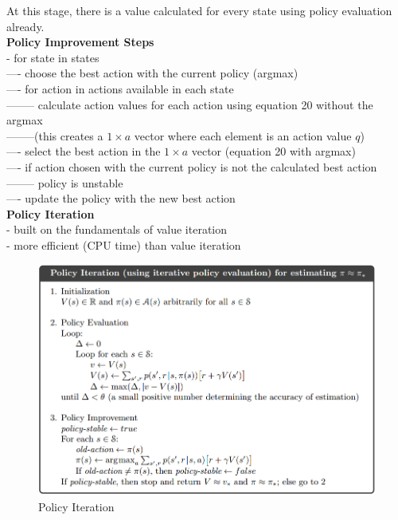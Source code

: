 \documentclass{article}
\begin{document}
\noindent
At this stage, there is a value calculated for every state using policy
evaluation already.\\

\noindent
\textbf{Policy Improvement Steps}\\
- for state in states \\
---- choose the best action with the current policy (argmax)\\
---- for action in actions available in each state \\
-------- calculate action values for each action using equation 20 without the
argmax\\
--------(this creates a $1 \times a$ vector where each element is an
action value $q$)\\
---- select the best action in the $ 1 \times a$ vector (equation 20 with
argmax)\\
---- if action chosen with the current policy is not the calculated best
action\\
-------- policy is unstable\\
---- update the policy with the new best action\\

\noindent
\textbf{Policy Iteration}\\
- built on the fundamentals of value iteration\\
- more efficient (CPU time) than value iteration

\begin{figure}[h]
\includegraphics[scale=0.4]{policy_iteration}
\centering
\caption{Policy Iteration}
\end{figure}
\end{document}
